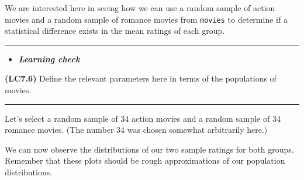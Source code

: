 \documentclass[]{tufte-book}
\newenvironment{Shaded}{\begin{snugshade}}{\end{snugshade}}
\newcommand{\KeywordTok}[1]{\textcolor[rgb]{0.13,0.29,0.53}{\textbf{{#1}}}}
\newcommand{\DataTypeTok}[1]{\textcolor[rgb]{0.13,0.29,0.53}{{#1}}}
\newcommand{\DecValTok}[1]{\textcolor[rgb]{0.00,0.00,0.81}{{#1}}}
\newcommand{\StringTok}[1]{\textcolor[rgb]{0.31,0.60,0.02}{{#1}}}
\newcommand{\NormalTok}[1]{{#1}}
\let\oldrule=\rule
\renewcommand{\rule}[1]{\oldrule{\linewidth}}
\newenvironment{rmdblock}[1]
  {\begin{shaded*}
  \begin{itemize}
  \renewcommand{\labelitemi}{
    \raisebox{-.7\height}[0pt][0pt]{
    }
  }
  \item
  }
  {
  \end{itemize}
  \end{shaded*}
  }
\newenvironment{learncheck}
  {\begin{rmdblock}{warning}}
  {\end{rmdblock}}
\begin{document}
We are interested here in seeing how we can use a random sample of
action movies and a random sample of romance movies from \texttt{movies}
to determine if a statistical difference exists in the mean ratings of
each group.

\begin{center}\rule{0.5\linewidth}{\linethickness}\end{center}

\begin{learncheck}
\textbf{\emph{Learning check}}
\end{learncheck}

\textbf{(LC7.6)} Define the relevant parameters here in terms of the
populations of movies.

\begin{center}\rule{0.5\linewidth}{\linethickness}\end{center}

Let's select a random sample of 34 action movies and a random sample of
34 romance movies. (The number 34 was chosen somewhat arbitrarily here.)

\begin{Shaded}
\end{Shaded}

We can now observe the distributions of our two sample ratings for both
groups. Remember that these plots should be rough approximations of our
population distributions.

\begin{Shaded}
\end{Shaded}
\end{document}
